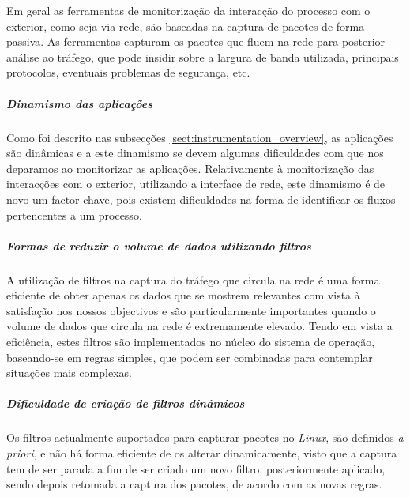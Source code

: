 % 
% 

Em geral as ferramentas de monitorização da interacção do processo com o exterior, como seja via rede, são baseadas na captura de pacotes de forma passiva.
As ferramentas capturam os pacotes que fluem na rede para posterior análise ao tráfego, que pode insidir sobre a largura de banda utilizada, principais protocolos, eventuais problemas de segurança, etc.

\subparagraph*{Dinamismo das aplicações}
Como foi descrito nas subsecções \ref{sect:instrumentation_overview}, as aplicações são dinâmicas e a este dinamismo se devem algumas dificuldades com que nos deparamos ao monitorizar as aplicações.
Relativamente à monitorização das interacções com o exterior, utilizando a interface de rede, este dinamismo é de novo um factor chave, pois existem dificuldades na forma de identificar os fluxos pertencentes a um processo.

\subparagraph*{Formas de reduzir o volume de dados utilizando filtros}
A utilização de filtros  na captura do tráfego que circula na rede é uma forma eficiente de obter apenas os dados que se mostrem relevantes com vista à satisfação nos nossos objectivos e são particularmente importantes quando o volume de dados que circula na rede é extremamente elevado.
Tendo em vista a eficiência, estes filtros são implementados no núcleo do sistema de operação, baseando-se em regras simples, que podem ser combinadas para contemplar situações mais complexas.

\subparagraph*{Dificuldade de criação de filtros dinâmicos}
Os filtros actualmente suportados para capturar pacotes no \textit{Linux}, são definidos \textit{a priori}, e não há forma eficiente de os alterar dinamicamente, visto que a captura tem de ser parada a fim de ser criado um novo filtro, posteriormente aplicado, sendo depois retomada a captura dos pacotes, de acordo com as novas regras.


